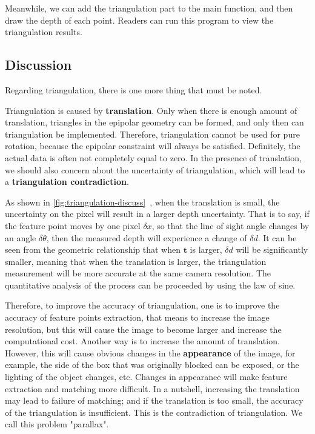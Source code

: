 Meanwhile, we can add the triangulation part to the main function, and then draw the depth of each point. Readers can run this program to view the triangulation results.

\subsection{Discussion}
Regarding triangulation, there is one more thing that must be noted.

Triangulation is caused by \textbf{translation}. Only when there is enough amount of translation, triangles in the epipolar geometry can be formed, and only then can triangulation be implemented. Therefore, triangulation cannot be used for pure rotation, because the epipolar constraint will always be satisfied. Definitely, the actual data is often not completely equal to zero. In the presence of translation, we should also concern about the uncertainty of triangulation, which will lead to a \textbf{triangulation contradiction}.

As shown in \autoref{fig:triangulation-discuss}~, when the translation is small, the uncertainty on the pixel will result in a larger depth uncertainty. That is to say, if the feature point moves by one pixel $\delta x$, so that the line of sight angle changes by an angle $\delta \theta$, then the measured depth will experience a change of $\delta d$. It can be seen from the geometric relationship that when $\bm{t}$ is larger, $\delta d$ will be significantly smaller, meaning that when the translation is larger, the triangulation measurement will be more accurate at the same camera resolution. The quantitative analysis of the process can be proceeded by using the law of sine.

Therefore, to improve the accuracy of triangulation, one is to improve the accuracy of feature points extraction, that means to increase the image resolution, but this will cause the image to become larger and increase the computational cost. Another way is to increase the amount of translation. However, this will cause obvious changes in the \textbf{appearance} of the image, for example, the side of the box that was originally blocked can be exposed, or the lighting of the object changes, etc. Changes in appearance will make feature extraction and matching more difficult. In a nutshell, increasing the translation may lead to failure of matching; and if the translation is too small, the accuracy of the triangulation is insufficient. This is the contradiction of triangulation. We call this problem "parallax".

